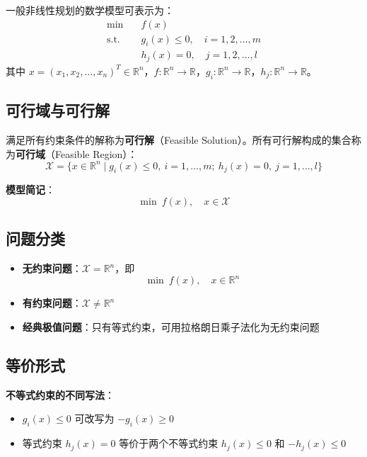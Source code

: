 一般非线性规划的数学模型可表示为：
\[
\begin{aligned}
\min\quad & f(x) \\
\text{s.t.}\quad & g_i(x) \leq 0,\quad i=1,2,\ldots,m \\
& h_j(x) = 0,\quad j=1,2,\ldots,l
\end{aligned}
\]
其中 $x = (x_1, x_2, \ldots, x_n)^T \in \mathbb{R}^n$，$f: \mathbb{R}^n \to \mathbb{R}$，$g_i: \mathbb{R}^n \to \mathbb{R}$，$h_j: \mathbb{R}^n \to \mathbb{R}$。

\subsection{可行域与可行解}

\begin{definition}[可行域]
满足所有约束条件的解称为\textbf{可行解}（Feasible Solution）。所有可行解构成的集合称为\textbf{可行域}（Feasible Region）：
\[
\mathcal{X} = \{x \in \mathbb{R}^n \mid g_i(x) \leq 0,\ i=1,\ldots,m;\ h_j(x)=0,\ j=1,\ldots,l\}
\]
\end{definition}

\textbf{模型简记}：
\[
\min\ f(x),\quad x \in \mathcal{X}
\]

\subsection{问题分类}

\begin{conceptbox}[分类标准]
\begin{itemize}[itemsep=0.3em]
    \item \textbf{无约束问题}：$\mathcal{X} = \mathbb{R}^n$，即
    \[\min\ f(x),\quad x \in \mathbb{R}^n\]
    \item \textbf{有约束问题}：$\mathcal{X} \neq \mathbb{R}^n$
    \item \textbf{经典极值问题}：只有等式约束，可用拉格朗日乘子法化为无约束问题
\end{itemize}
\end{conceptbox}

\subsection{等价形式}

\textbf{不等式约束的不同写法}：
\begin{itemize}[itemsep=0.3em]
    \item $g_i(x) \leq 0$ 可改写为 $-g_i(x) \geq 0$
    \item 等式约束 $h_j(x) = 0$ 等价于两个不等式约束 $h_j(x) \leq 0$ 和 $-h_j(x) \leq 0$
\end{itemize}

